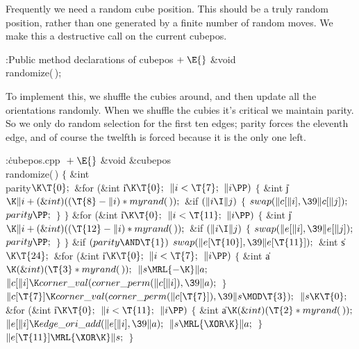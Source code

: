 Frequently we need a random cube position.  This should be
a truly random position, rather than one generated by a
finite number of random moves.  We make this a destructive
 call on the current cubepos.

\Y\B\4:Public method declarations of cubepos\X${}\mathrel+\E{}$\6
\&{void} \\{randomize}(\,);\par
\fi

To implement this, we shuffle the cubies around, and then
update all the orientations randomly.  When we shuffle the
cubies it's critical we maintain parity.  So we only do
random selection for the first ten edges; parity forces
the eleventh edge, and of course the twelfth is forced because
it is the only one left.

\Y\B\4:\.{cubepos.cpp }\X${}\mathrel+\E{}$\6
\&{void} \&{cubepos}\DC\\{randomize}(\,)\1\1\2\2\6
${}\{{}$\1\6
\&{int} \\{parity}${}\K\T{0};{}$\7
\&{for} (\&{int} \|i${}\K\T{0};{}$ ${}\|i<\T{7};{}$ ${}\|i\PP){}$\5
${}\{{}$\1\6
\&{int} \|j${}\K\|i+(\&{int})((\T{8}-\|i)*\\{myrand}(\,));{}$\7
\&{if} ${}(\|i\I\|j){}$\5
${}\{{}$\1\6
${}\\{swap}(\|c[\|i],\39\|c[\|j]);{}$\6
${}\\{parity}\PP;{}$\6
\4${}\}{}$\2\6
\4${}\}{}$\2\6
\&{for} (\&{int} \|i${}\K\T{0};{}$ ${}\|i<\T{11};{}$ ${}\|i\PP){}$\5
${}\{{}$\1\6
\&{int} \|j${}\K\|i+(\&{int})((\T{12}-\|i)*\\{myrand}(\,));{}$\7
\&{if} ${}(\|i\I\|j){}$\5
${}\{{}$\1\6
${}\\{swap}(\|e[\|i],\39\|e[\|j]);{}$\6
${}\\{parity}\PP;{}$\6
\4${}\}{}$\2\6
\4${}\}{}$\2\6
\&{if} ${}(\\{parity}\AND\T{1}){}$\1\5
${}\\{swap}(\|e[\T{10}],\39\|e[\T{11}]);{}$\2\7
\&{int} \|s${}\K\T{24};{}$\7
\&{for} (\&{int} \|i${}\K\T{0};{}$ ${}\|i<\T{7};{}$ ${}\|i\PP){}$\5
${}\{{}$\1\6
\&{int} \|a${}\K(\&{int})(\T{3}*\\{myrand}(\,));{}$\7
${}\|s\MRL{-{\K}}\|a;{}$\6
${}\|c[\|i]\K\\{corner\_val}(\\{corner\_perm}(\|c[\|i]),\39\|a);{}$\6
\4${}\}{}$\2\6
${}\|c[\T{7}]\K\\{corner\_val}(\\{corner\_perm}(\|c[\T{7}]),\39\|s\MOD%
\T{3});{}$\6
${}\|s\K\T{0};{}$\6
\&{for} (\&{int} \|i${}\K\T{0};{}$ ${}\|i<\T{11};{}$ ${}\|i\PP){}$\5
${}\{{}$\1\6
\&{int} \|a${}\K(\&{int})(\T{2}*\\{myrand}(\,));{}$\7
${}\|e[\|i]\K\\{edge\_ori\_add}(\|e[\|i],\39\|a);{}$\6
${}\|s\MRL{{\XOR}{\K}}\|a;{}$\6
\4${}\}{}$\2\6
${}\|e[\T{11}]\MRL{{\XOR}{\K}}\|s;{}$\6
\4${}\}{}$\2\par
\fi


